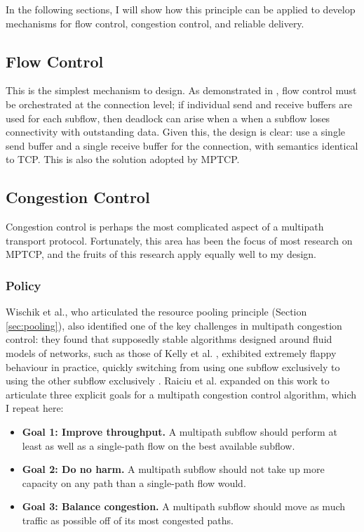 In the following sections, I will show how this principle can be applied to develop mechanisms for flow control, congestion control, and reliable delivery.

\subsection{Flow Control}
This is the simplest mechanism to design. As demonstrated in \cite{raiciu2012hard}, flow control must be orchestrated at the connection level; if individual send and receive buffers are used for each subflow, then deadlock can arise when a when a subflow loses connectivity with outstanding data. Given this, the design is clear: use a single send buffer and a single receive buffer for the connection, with semantics identical to TCP. This is also the solution adopted by MPTCP.

\subsection{Congestion Control}
Congestion control is perhaps the most complicated aspect of a multipath transport protocol. Fortunately, this area has been the focus of most research on MPTCP, and the fruits of this research apply equally well to my design.

\subsubsection{Policy}

Wischik et al., who articulated the resource pooling principle (Section \ref{sec:pooling}), also identified one of the key challenges in multipath congestion control: they found that supposedly stable algorithms designed around fluid models of networks, such as those of Kelly et al. \cite{kelly2005stability}, exhibited extremely flappy behaviour in practice, quickly switching from using one subflow exclusively to using the other subflow exclusively \cite{wischik2009control}. Raiciu et al. expanded on this work to articulate three explicit goals for a multipath congestion control algorithm, which I repeat here: \cite{raiciu2009practical}

\begin{itemize}
  \item \textbf{Goal 1: Improve throughput.} A multipath subflow should perform at least as well as a single-path flow on the best available subflow.
  \item \textbf{Goal 2: Do no harm.} A multipath subflow should not take up more capacity on any path than a single-path flow would.
  \item \textbf{Goal 3: Balance congestion.} A multipath subflow should move as much traffic as possible off of its most congested paths.
\end{itemize}


